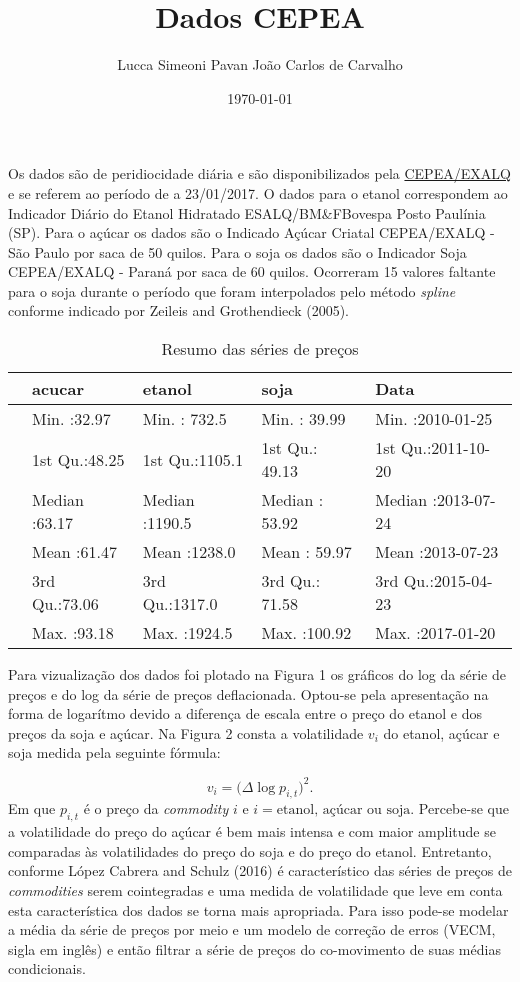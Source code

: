 \documentclass[]{article}
\title{Dados CEPEA}
\author{Lucca Simeoni Pavan \hspace{1cm} João Carlos de Carvalho}
\date{\today}
\begin{document}
\maketitle

Os dados são de peridiocidade diária e são disponibilizados pela
\href{http://www.cepea.esalq.usp.br/br/consultas-ao-banco-de-dados-do-site.aspx}{CEPEA/EXALQ}
e se referem ao período de a 23/01/2017. O dados para o etanol
correspondem ao Indicador Diário do Etanol Hidratado ESALQ/BM\&FBovespa
Posto Paulínia (SP). Para o açúcar os dados são o Indicado Açúcar
Criatal CEPEA/EXALQ - São Paulo por saca de 50 quilos. Para o soja os
dados são o Indicador Soja CEPEA/EXALQ - Paraná por saca de 60 quilos.
Ocorreram 15 valores faltante para o soja durante o período que foram
interpolados pelo método \emph{spline} conforme indicado por Zeileis and
Grothendieck (2005).

\begin{longtable}[t]{lllll}
\caption{\label{tab:unnamed-chunk-5}Resumo das séries de preços}\\
\toprule
  &     acucar &     etanol &      soja &      Data\\
\midrule
 & Min.   :32.97 & Min.   : 732.5 & Min.   : 39.99 & Min.   :2010-01-25\\
 & 1st Qu.:48.25 & 1st Qu.:1105.1 & 1st Qu.: 49.13 & 1st Qu.:2011-10-20\\
 & Median :63.17 & Median :1190.5 & Median : 53.92 & Median :2013-07-24\\
 & Mean   :61.47 & Mean   :1238.0 & Mean   : 59.97 & Mean   :2013-07-23\\
 & 3rd Qu.:73.06 & 3rd Qu.:1317.0 & 3rd Qu.: 71.58 & 3rd Qu.:2015-04-23\\
 & Max.   :93.18 & Max.   :1924.5 & Max.   :100.92 & Max.   :2017-01-20\\
\bottomrule
\end{longtable}

Para vizualização dos dados foi plotado na Figura 1 os gráficos do log
da série de preços e do log da série de preços deflacionada. Optou-se
pela apresentação na forma de logarítmo devido a diferença de escala
entre o preço do etanol e dos preços da soja e açúcar. Na Figura 2
consta a volatilidade \(v_i\) do etanol, açúcar e soja medida pela
seguinte fórmula:

\[v_i = \bigg(\Delta \log p_{i,t}\bigg)^2.\] Em que \(p_{i,t}\) é o
preço da \emph{commodity} \(i\) e \(i = \text{etanol, açúcar ou soja}\).
Percebe-se que a volatilidade do preço do açúcar é bem mais intensa e
com maior amplitude se comparadas às volatilidades do preço do soja e do
preço do etanol. Entretanto, conforme López Cabrera and Schulz (2016) é
característico das séries de preços de \emph{commodities} serem
cointegradas e uma medida de volatilidade que leve em conta esta
característica dos dados se torna mais apropriada. Para isso pode-se
modelar a média da série de preços por meio e um modelo de correção de
erros (VECM, sigla em inglês) e então filtrar a série de preços do
co-movimento de suas médias condicionais.
\end{document}
